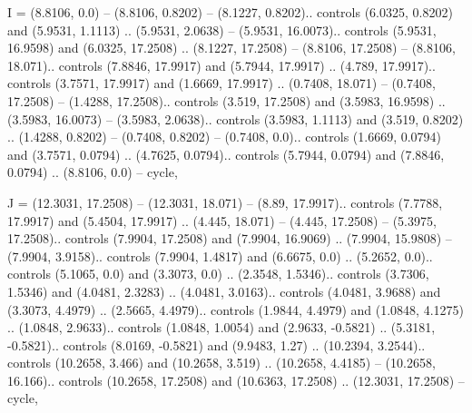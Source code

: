 I = {(8.8106, 0.0) -- (8.8106, 0.8202) -- (8.1227, 0.8202).. controls (6.0325, 0.8202) and (5.9531, 1.1113) .. (5.9531, 2.0638) -- (5.9531, 16.0073).. controls (5.9531, 16.9598) and (6.0325, 17.2508) .. (8.1227, 17.2508) -- (8.8106, 17.2508) -- (8.8106, 18.071).. controls (7.8846, 17.9917) and (5.7944, 17.9917) .. (4.789, 17.9917).. controls (3.7571, 17.9917) and (1.6669, 17.9917) .. (0.7408, 18.071) -- (0.7408, 17.2508) -- (1.4288, 17.2508).. controls (3.519, 17.2508) and (3.5983, 16.9598) .. (3.5983, 16.0073) -- (3.5983, 2.0638).. controls (3.5983, 1.1113) and (3.519, 0.8202) .. (1.4288, 0.8202) -- (0.7408, 0.8202) -- (0.7408, 0.0).. controls (1.6669, 0.0794) and (3.7571, 0.0794) .. (4.7625, 0.0794).. controls (5.7944, 0.0794) and (7.8846, 0.0794) .. (8.8106, 0.0) -- cycle},

J = {(12.3031, 17.2508) -- (12.3031, 18.071) -- (8.89, 17.9917).. controls (7.7788, 17.9917) and (5.4504, 17.9917) .. (4.445, 18.071) -- (4.445, 17.2508) -- (5.3975, 17.2508).. controls (7.9904, 17.2508) and (7.9904, 16.9069) .. (7.9904, 15.9808) -- (7.9904, 3.9158).. controls (7.9904, 1.4817) and (6.6675, 0.0) .. (5.2652, 0.0).. controls (5.1065, 0.0) and (3.3073, 0.0) .. (2.3548, 1.5346).. controls (3.7306, 1.5346) and (4.0481, 2.3283) .. (4.0481, 3.0163).. controls (4.0481, 3.9688) and (3.3073, 4.4979) .. (2.5665, 4.4979).. controls (1.9844, 4.4979) and (1.0848, 4.1275) .. (1.0848, 2.9633).. controls (1.0848, 1.0054) and (2.9633, -0.5821) .. (5.3181, -0.5821).. controls (8.0169, -0.5821) and (9.9483, 1.27) .. (10.2394, 3.2544).. controls (10.2658, 3.466) and (10.2658, 3.519) .. (10.2658, 4.4185) -- (10.2658, 16.166).. controls (10.2658, 17.2508) and (10.6363, 17.2508) .. (12.3031, 17.2508) -- cycle},

